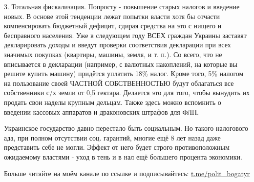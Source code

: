 3. Тотальная фискализация. Попросту - повышение старых налогов и введение
новых. В основе этой тенденции лежат попытки власти хотя бы отчасти
компенсировать бюджетный дефицит, сдирая средства на это с нищего и бесправного
населения. Уже в следующем году ВСЕХ граждан Украины заставят декларировать
доходы и введут проверки соответствия декларации при всех значимых покупках
(квартиры, машины, земля, и т. п.). Со всего, что не вписывается в декларации
(например, с валютных накоплений, на которые вы решите купить машину) придётся
уплатить 18\% налог. Кроме того, 5\% налогом на пользование своей ЧАСТНОЙ
СОБСТВЕННОСТЬЮ будут облагаться все собственники с/х земли от 0,5 гектара.
Делается это для того, чтобы вынудить их продать свои наделы крупным дельцам.
Также здесь можно вспомнить о введении кассовых аппаратов и драконовских
штрафов для ФЛП.

Украинское государство давно перестало быть социальным. Но такого налогового
ада, при полном отсутствии соц. гарантий, многие ещё 8 лет назад даже
представить себе не могли. Эффект от него будет строго противоположным
ожидаемому властями - уход в тень и в нал ещё большего процента экономики.

Больше читайте на моём канале по ссылке и подписывайтесь: \url{t.me/polit_bogatyr}

